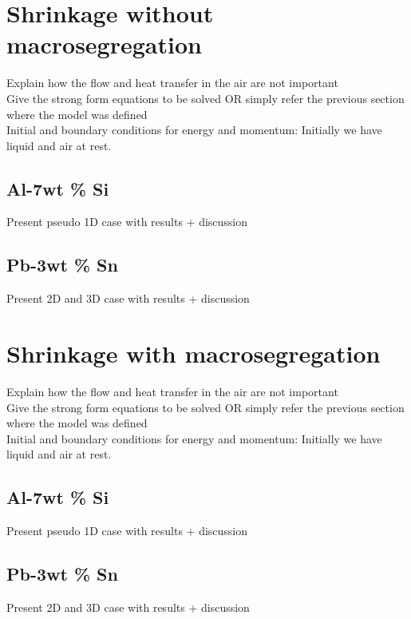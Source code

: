 \section{Shrinkage without macrosegregation}
Explain how the flow and heat transfer in the air are not important \\ 
Give the strong form equations to be solved OR simply refer the previous section where the model was defined \\
Initial and boundary conditions for energy and momentum:  Initially we have liquid and air at rest. 
\subsection{Al-7wt \% Si}
Present pseudo 1D case with results + discussion
\subsection{Pb-3wt \% Sn}
Present 2D and 3D case with results + discussion
\section{Shrinkage with macrosegregation}
Explain how the flow and heat transfer in the air are not important \\ 
Give the strong form equations to be solved OR simply refer the previous section where the model was defined \\
Initial and boundary conditions for energy and momentum:  Initially we have liquid and air at rest. 
\subsection{Al-7wt \% Si}
Present pseudo 1D case with results + discussion
\subsection{Pb-3wt \% Sn}
Present 2D and 3D case with results + discussion

